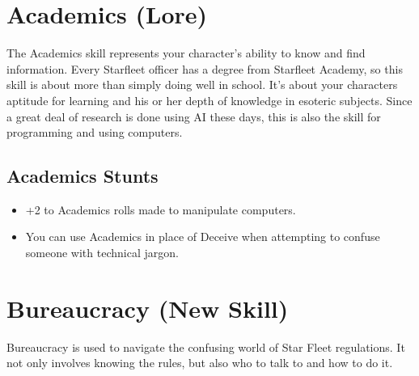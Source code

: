 \documentclass[12pt,titlepage,openany]{book}
\begin{document}
\section{Academics (Lore)}\label{sec:academics}

The Academics skill represents your character's ability to know and find
information. Every Starfleet officer has a degree from Starfleet Academy, so
this skill is about more than simply doing well in school. It's about your
characters aptitude for learning and his or her depth of knowledge in esoteric
subjects. Since a great deal of research is done using AI these days, this is
also the skill for programming and using computers.

\subsection*{Academics Stunts}\label{subsec:academics-stunts}

\begin{itemize}
    \item {} +2 to Academics rolls made to manipulate
        computers.
    \item {} You can use Academics in place of Deceive when
        attempting to confuse someone with technical jargon.
\end{itemize}

\section{Bureaucracy (New Skill)}\label{sec:bureaucracy}

Bureaucracy is used to navigate the confusing world of Star Fleet regulations.
It not only involves knowing the rules, but also who to talk to and how to do
it.

\begin{SkillActionList}



\end{SkillActionList}
\end{document}
